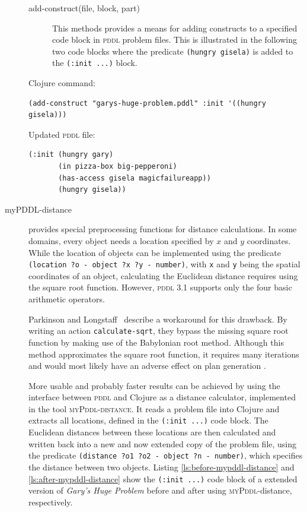 \documentclass[runningheads]{llncs}
\newcommand{\mypddl}{\textsc{myPddl}\xspace}
\newcommand{\mypddldistance}{\textsc{myPddl-distance}\xspace}
\newcommand{\pddl}{\textsc{pddl}\xspace}
\begin{document}
\begin{description}
\begin{description}
\item[{add-construct(file, block, part)}] This methods provides a
  means for adding constructs to a specified code block in \pddl
  problem files. This is illustrated in the following two code blocks
  where the predicate \texttt{(hungry gisela)} is added to the
  \texttt{(:init~...)} block.
\end{description}
Clojure command:
\begin{verbatim}
(add-construct "garys-huge-problem.pddl" :init '((hungry gisela)))
\end{verbatim}
Updated \pddl file:
\begin{verbatim}
(:init (hungry gary)
       (in pizza-box big-pepperoni)
       (has-access gisela magicfailureapp))
       (hungry gisela))
\end{verbatim}


\item[myPDDL-distance] provides special preprocessing functions for
  distance calculations. In some domains, every object needs a
  location specified by $x$ and $y$ coordinates.  While the location
  of objects can be implemented using the predicate \texttt{(location
    ?o - object ?x ?y - number)}, with \texttt{x} and \texttt{y} being
  the spatial coordinates of an object, calculating the Euclidean
  distance requires using the square root function. However, \pddl 3.1
  supports only the four basic arithmetic operators.

  Parkinson and Longstaff~\cite{parkinson2012increasing} describe a
  workaround for this drawback. By writing an action
  \texttt{calculate-sqrt}, they bypass the missing square root
  function by making use of the Babylonian root method. Although this
  method approximates the square root function, it requires many
  iterations and would most likely have an adverse effect on plan
  generation \cite{parkinson2012increasing}.

More usable and probably faster results can be achieved by using the
interface between \pddl and Clojure as a distance calculator,
implemented in the tool \mypddldistance. It reads a problem file into
Clojure and extracts all locations, defined in the \texttt{(:init
  ...)} code block. The Euclidean distances between these locations
are then calculated and written back into a new and now extended copy
of the problem file, using the predicate
\texttt{(distance~?o1~?o2~-~object ?n~-~number)}, which specifies the
distance between two objects. Listing \ref{ls:before-mypddl-distance}
and \ref{ls:after-mypddl-distance} show the \texttt{(:init ...)} code
block of a extended version of \emph{Gary's Huge Problem} before and
after using \mypddl-distance, respectively.


\end{description}
\end{document}
